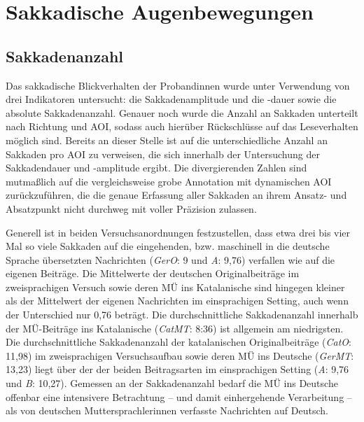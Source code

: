 

\section{Sakkadische Augenbewegungen}
\label{K7:sec:sac-movements}



\subsection{Sakkadenanzahl}\label{K7:para:Sakkadenanzahl}
Das sakkadische Blickverhalten der Proband{\textperiodcentered}innen wurde unter Verwendung von drei Indikatoren untersucht: die Sakkadenamplitude und die \mbox{-dauer} sowie die absolute Sakkadenanzahl. Genauer noch wurde die Anzahl an Sakkaden unterteilt nach Richtung und AOI, sodass auch hierüber Rückschlüsse auf das Leseverhalten möglich sind. Bereits an dieser Stelle ist auf die unterschiedliche Anzahl an Sakkaden pro AOI zu verweisen, die sich innerhalb der Untersuchung der Sakkadendauer und -amplitude ergibt. Die divergierenden Zahlen sind mutmaßlich auf die vergleichsweise grobe Annotation mit dynamischen AOI zurückzuführen, die die genaue Erfassung aller Sakkaden an ihrem Ansatz- und Absatzpunkt nicht durchweg mit voller Präzision zulassen.  

Generell ist in beiden Versuchsanordnungen festzustellen, dass etwa drei bis vier Mal so viele Sakkaden auf die eingehenden, bzw. maschinell in die deutsche Sprache übersetzten Nachrichten (\emph{GerO}: 9 und \emph{A}: 9,76) verfallen wie auf die eigenen Beiträge. Die Mittelwerte der deutschen Originalbeiträge im zweisprachigen Versuch sowie deren MÜ ins Katalanische sind hingegen kleiner als der Mittelwert der eigenen Nachrichten im einsprachigen Setting, auch wenn der Unterschied nur 0,76 beträgt. Die durchschnittliche Sakkadenanzahl innerhalb der MÜ-Beiträge ins Katalanische (\emph{CatMT}: 8:36) ist allgemein am niedrigsten. Die durchschnittliche Sakkadenanzahl der katalanischen Originalbeiträge (\emph{CatO}: 11,98) im zweisprachigen Versuchsaufbau sowie deren MÜ ins Deutsche (\emph{GerMT}: 13,23) liegt über der der beiden Beitragsarten im einsprachigen Setting (\emph{A}: 9,76 und \emph{B}: 10,27). Gemessen an der Sakkadenanzahl bedarf die MÜ ins Deutsche offenbar eine intensivere Betrachtung -- und damit einhergehende Verarbeitung -- als von deutschen Muttersprachler{\textperiodcentered}innen verfasste Nachrichten auf Deutsch. 


